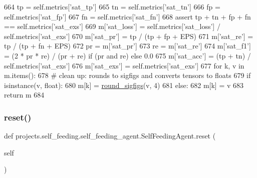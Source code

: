 \begin{DoxyCode}
664                 tp = self.metrics[\textcolor{stringliteral}{'sat\_tp'}]
665                 tn = self.metrics[\textcolor{stringliteral}{'sat\_tn'}]
666                 fp = self.metrics[\textcolor{stringliteral}{'sat\_fp'}]
667                 fn = self.metrics[\textcolor{stringliteral}{'sat\_fn'}]
668                 \textcolor{keyword}{assert} tp + tn + fp + fn == self.metrics[\textcolor{stringliteral}{'sat\_exs'}]
669                 m[\textcolor{stringliteral}{'sat\_loss'}] = self.metrics[\textcolor{stringliteral}{'sat\_loss'}] / self.metrics[\textcolor{stringliteral}{'sat\_exs'}]
670                 m[\textcolor{stringliteral}{'sat\_pr'}] = tp / (tp + fp + EPS)
671                 m[\textcolor{stringliteral}{'sat\_re'}] = tp / (tp + fn + EPS)
672                 pr = m[\textcolor{stringliteral}{'sat\_pr'}]
673                 re = m[\textcolor{stringliteral}{'sat\_re'}]
674                 m[\textcolor{stringliteral}{'sat\_f1'}] = (2 * pr * re) / (pr + re) \textcolor{keywordflow}{if} (pr \textcolor{keywordflow}{and} re) \textcolor{keywordflow}{else} 0.0
675                 m[\textcolor{stringliteral}{'sat\_acc'}] = (tp + tn) / self.metrics[\textcolor{stringliteral}{'sat\_exs'}]
676                 m[\textcolor{stringliteral}{'sat\_exs'}] = self.metrics[\textcolor{stringliteral}{'sat\_exs'}]
677         \textcolor{keywordflow}{for} k, v \textcolor{keywordflow}{in} m.items():
678             \textcolor{comment}{# clean up: rounds to sigfigs and converts tensors to floats}
679             \textcolor{keywordflow}{if} isinstance(v, float):
680                 m[k] = \hyperlink{namespaceparlai_1_1agents_1_1legacy__agents_1_1seq2seq_1_1utils__v0_af377ec61bfc0423461e7b409ffc883b9}{round\_sigfigs}(v, 4)
681             \textcolor{keywordflow}{else}:
682                 m[k] = v
683         \textcolor{keywordflow}{return} m
684 
\end{DoxyCode}
\mbox{\label{classprojects_1_1self__feeding_1_1self__feeding__agent_1_1SelfFeedingAgent_aa94174029fa282fd301ae01ea2ac90de}} 
\subsubsection{\texorpdfstring{reset()}{reset()}}
{\footnotesize\ttfamily def projects.\+self\+\_\+feeding.\+self\+\_\+feeding\+\_\+agent.\+Self\+Feeding\+Agent.\+reset (\begin{DoxyParamCaption}\item[{}]{self }\end{DoxyParamCaption})}



